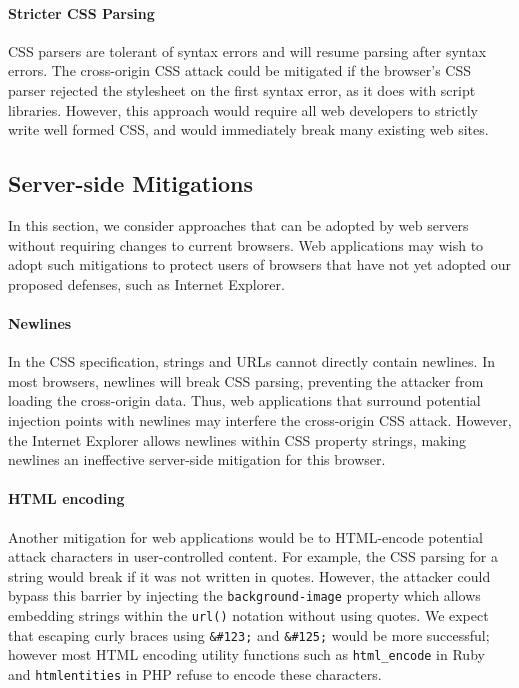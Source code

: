\documentclass{acm_proc_article-sp}
\begin{document}
\paragraph{Stricter CSS Parsing}
CSS parsers are tolerant of syntax errors and will resume parsing after syntax errors. The cross-origin CSS attack could be mitigated if the browser's CSS parser rejected the stylesheet on the first syntax error, as it does with script libraries. However, this approach would require all web developers to strictly write well formed CSS, and would immediately break many existing web sites.

\subsection{Server-side Mitigations}
In this section, we consider approaches that can be adopted by web servers
without requiring changes to current browsers. Web applications may wish to
adopt such mitigations to protect users of browsers that have not yet adopted
our proposed defenses, such as Internet Explorer.

\paragraph{Newlines}
In the CSS specification, strings and URLs cannot directly contain newlines.
In most browsers, newlines will break CSS parsing, preventing the attacker from loading the cross-origin data.
Thus, web applications that surround potential injection points with
newlines may interfere the cross-origin CSS attack.
However, the Internet Explorer allows newlines within CSS
property strings, making newlines an ineffective server-side mitigation for this browser.

\paragraph{HTML encoding}
Another mitigation for web applications would be to HTML-encode potential attack characters in user-controlled content. For example, the CSS parsing for a string would break if it was not written in quotes. However, the attacker could bypass this barrier by injecting the \texttt{background-image} property which allows embedding strings within the \texttt{url()} notation without using quotes. We expect that escaping curly braces using \verb|&#123;| and \verb|&#125;| would be more successful; however most HTML encoding utility functions such as \verb|html_encode| in Ruby and \verb|htmlentities| in PHP refuse to encode these characters.
\end{document}
